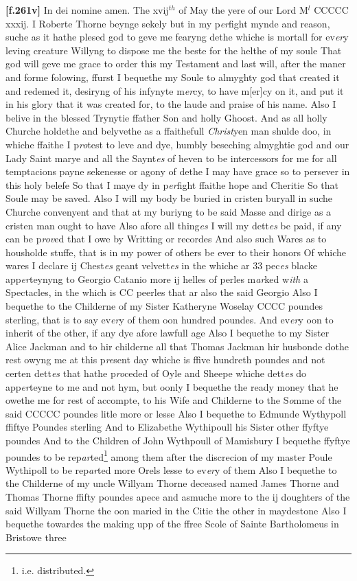 \documentclass[a4paper,12pt]{article}
\begin{document}
\textbf{[f.261v]} In dei nomine amen. The xvij$^{th}$ of May the yere of our Lord M$^{l}$ CCCCC xxxij. I Roberte Thorne beynge sekely but in my p\textit{er}fight mynde and reason, suche as it hathe plesed god to geve me fearyng dethe whiche is mortall for ev\textit{er}y leving creature  Willyng to dispose me the beste for the helthe of my soule That god will geve me grace to order this my Testament and last will, after the maner and forme folowing, ffurst I bequethe my Soule to almyghty god that created it and redemed it, desiryng of his infynyte m\textit{er}cy, to have m[er]cy on it, and put it in his glory that it was created for, to the laude and praise of his name. Also I belive in the blessed Trynytie ffather Son and holly Ghoost. And as all holly Churche holdethe and belyvethe as a ffaithefull \textit{Christ}yen man shulde doo, in whiche ffaithe I p\textit{ro}test to leve and dye, humbly beseching almyghtie god and our Lady Saint marye and all the Saynt\textit{es} of heven to be intercessors for me for all temptacions payne sekenesse or agony of dethe I may have grace so to persever in this holy belefe So that I maye dy in p\textit{er}fight ffaithe hope and Cheritie So that Soule may be saved. Also I will my body be buried in cristen buryall in suche Churche convenyent and that at my buriyng to be said Masse and dirige as a cristen man ought to have Also afore all thing\textit{es} I will my dett\textit{es} be paid, if any can be p\textit{rov}ed that I owe by Writting or recordes And also such Wares as to housholde stuffe, that is in my power of others be ever to their honors Of whiche wares I declare ij Chest\textit{es} geant velvett\textit{es} in the whiche ar 33 pec\textit{es} blacke app\textit{er}teynyng to Georgio Catanio more ij helles of perles m\textit{ar}ked w\textit{ith} a Spectacles, in the which is CC peerles that ar also the said Georgio Also I bequethe to the Childerne of my Sister Katheryne Woselay CCCC poundes sterling, that is to say ev\textit{er}y of them oon hundred poundes. And ev\textit{er}y oon to inherit of the other, if any dye afore lawfull age Also I bequethe to my Sister Alice Jackman and to hir childerne all that Thomas Jackman hir husbonde dothe rest owyng me at this p\textit{re}sent day whiche is ffive hundreth poundes and not certen dett\textit{es} that hathe p\textit{ro}ceded of Oyle and Sheepe whiche dett\textit{es} do app\textit{er}teyne to me and not hym, but oonly I bequethe the ready money that he owethe me for rest of accompte, to his Wife and Childerne to the S\textit{o}mme of the said CCCCC poundes litle more or lesse Also I bequethe to Edmunde Wythypoll ffiftye Poundes sterling And to Elizabethe Wythipoull his Sister other ffyftye poundes And to the Children of John Wythpoull of Mamisbury I bequethe ffyftye poundes to be rep\textit{ar}ted\footnote{i.e. distributed.} among them after the discrecion of my master Poule Wythipoll to be rep\textit{ar}ted more Orels lesse to ev\textit{er}y of them Also I bequethe to the Childerne of my uncle Willyam Thorne deceased named James Thorne and Thomas Thorne ffifty poundes apece and asmuche more to the ij doughters of the said Willyam Thorne the oon maried in the Citie the other in maydestone Also I bequethe towardes the making upp of the ffree Scole of Sainte Bartholomeus in Bristowe three 
\end{document}
